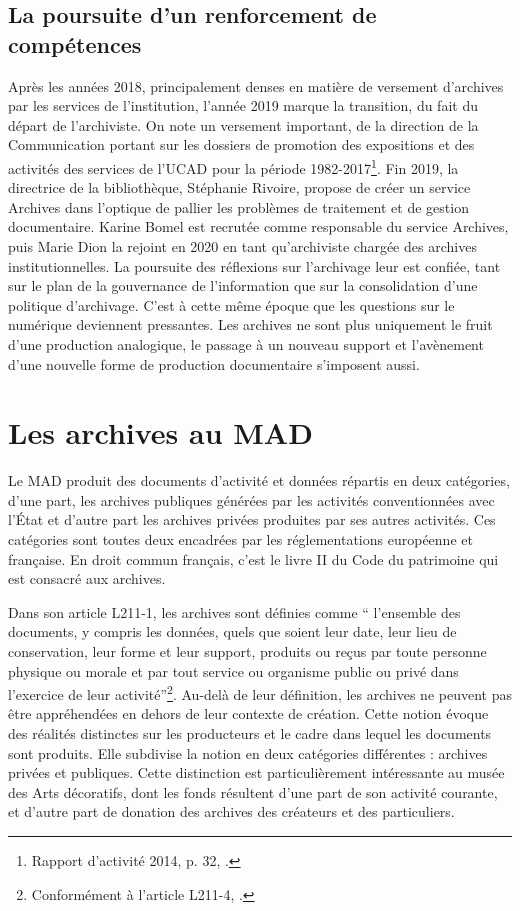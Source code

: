 \subsection*{La poursuite d’un renforcement de compétences}

Après les années 2018, principalement denses en matière de versement d’archives par les services de l’institution, l’année 2019 marque la transition, du fait du départ de l’archiviste. On note un versement important, de la direction de la Communication portant sur les dossiers de promotion des expositions et des activités des services de l’UCAD pour la période 1982-2017\footnote{Rapport d’activité 2014, p. 32, \cite{JP801-rapports}.}. Fin 2019, la directrice de la bibliothèque, Stéphanie Rivoire, propose de créer un service Archives dans l’optique de pallier les problèmes de traitement et de gestion documentaire. Karine Bomel est recrutée comme responsable du service Archives, puis Marie Dion la rejoint en 2020 en tant qu’archiviste chargée des archives institutionnelles. La poursuite des réflexions sur l’archivage leur est confiée, tant sur le plan de la gouvernance de l’information que sur la consolidation d’une politique d’archivage. C'est à cette même époque que les questions sur le numérique deviennent pressantes. Les archives ne sont plus uniquement le fruit d’une production analogique, le passage à un nouveau support et  l’avènement d’une nouvelle forme de production documentaire s’imposent aussi.


\section{Les archives au MAD}

Le MAD produit des documents d’activité et données répartis en deux catégories, d’une part, les archives publiques générées par les activités conventionnées avec l’État et d'autre part les archives privées produites par ses autres activités. Ces catégories sont toutes deux encadrées par les réglementations européenne et française. En droit commun français, c’est le livre II du Code du patrimoine qui est consacré aux archives.

Dans son article L211-1, les archives sont définies comme \enquote{ l'ensemble des documents, y compris les données, quels que soient leur date, leur lieu de conservation, leur forme et leur support, produits ou reçus par toute personne physique ou morale et par tout service ou organisme public ou privé dans l'exercice de leur activité}\footnote{Conformément à l'article L211-4, \cite{code-patrimoine-legislative} .}. Au-delà de leur définition, les archives ne peuvent pas être appréhendées en dehors de leur contexte de création. Cette notion évoque des réalités distinctes sur les producteurs et le cadre dans lequel les documents sont produits. Elle subdivise la notion en deux catégories différentes : archives privées et publiques. Cette distinction est particulièrement intéressante au musée des Arts décoratifs, dont les fonds résultent d’une part de son activité courante, et d’autre part de donation des archives des créateurs et des particuliers.


